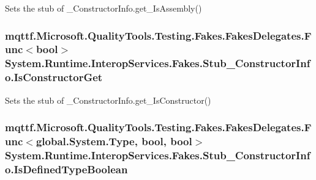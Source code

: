 Sets the stub of \-\_\-\-Constructor\-Info.\-get\-\_\-\-Is\-Assembly()

\hypertarget{class_system_1_1_runtime_1_1_interop_services_1_1_fakes_1_1_stub___constructor_info_aed677457a49dabe6784d0d98ca2bed2a}{
\subsubsection[{Is\-Constructor\-Get}]{\setlength{\rightskip}{0pt plus 5cm}mqttf.\-Microsoft.\-Quality\-Tools.\-Testing.\-Fakes.\-Fakes\-Delegates.\-Func$<$bool$>$ System.\-Runtime.\-Interop\-Services.\-Fakes.\-Stub\-\_\-\-Constructor\-Info.\-Is\-Constructor\-Get}}\label{class_system_1_1_runtime_1_1_interop_services_1_1_fakes_1_1_stub___constructor_info_aed677457a49dabe6784d0d98ca2bed2a}


Sets the stub of \-\_\-\-Constructor\-Info.\-get\-\_\-\-Is\-Constructor()

\hypertarget{class_system_1_1_runtime_1_1_interop_services_1_1_fakes_1_1_stub___constructor_info_a8cc58e858fd7fac4cccdbeef4a57d30c}{
\subsubsection[{Is\-Defined\-Type\-Boolean}]{\setlength{\rightskip}{0pt plus 5cm}mqttf.\-Microsoft.\-Quality\-Tools.\-Testing.\-Fakes.\-Fakes\-Delegates.\-Func$<$global.\-System.\-Type, bool, bool$>$ System.\-Runtime.\-Interop\-Services.\-Fakes.\-Stub\-\_\-\-Constructor\-Info.\-Is\-Defined\-Type\-Boolean}}\label{class_system_1_1_runtime_1_1_interop_services_1_1_fakes_1_1_stub___constructor_info_a8cc58e858fd7fac4cccdbeef4a57d30c}


